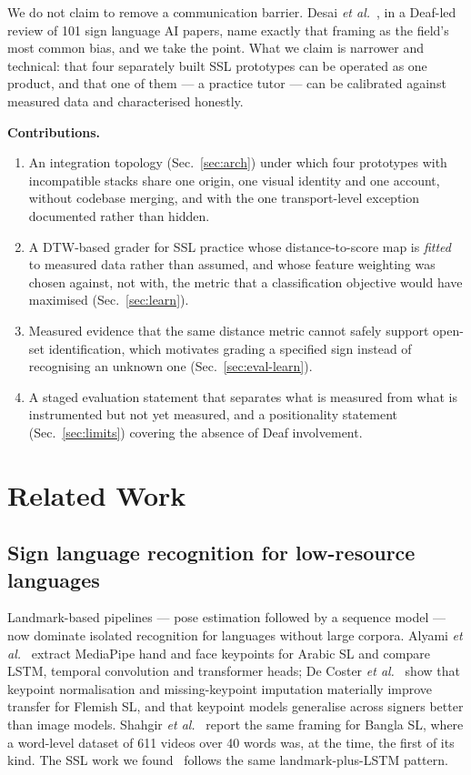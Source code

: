 \documentclass[conference]{IEEEtran}
\begin{document}
We do not claim to remove a communication barrier. Desai
\emph{et al.}~\cite{desai2024systemic}, in a Deaf-led review of 101 sign
language AI papers, name exactly that framing as the field's most common
bias, and we take the point. What we claim is narrower and technical: that
four separately built SSL prototypes can be operated as one product, and that
one of them --- a practice tutor --- can be calibrated against measured data
and characterised honestly.

\textbf{Contributions.}
\begin{enumerate}
\item An integration topology (Sec.~\ref{sec:arch}) under which four
prototypes with incompatible stacks share one origin, one visual identity and
one account, without codebase merging, and with the one transport-level
exception documented rather than hidden.
\item A DTW-based grader for SSL practice whose distance-to-score map is
\emph{fitted} to measured data rather than assumed, and whose feature
weighting was chosen against, not with, the metric that a classification
objective would have maximised (Sec.~\ref{sec:learn}).
\item Measured evidence that the same distance metric cannot safely support
open-set identification, which motivates grading a specified sign instead of
recognising an unknown one (Sec.~\ref{sec:eval-learn}).
\item A staged evaluation statement that separates what is measured from what
is instrumented but not yet measured, and a positionality statement
(Sec.~\ref{sec:limits}) covering the absence of Deaf involvement.
\end{enumerate}

\section{Related Work}

\subsection{Sign language recognition for low-resource languages}
Landmark-based pipelines --- pose estimation followed by a sequence model ---
now dominate isolated recognition for languages without large corpora.
Alyami \emph{et al.}~\cite{alyami2024isolated} extract MediaPipe hand and face
keypoints for Arabic SL and compare LSTM, temporal convolution and
transformer heads; De Coster \emph{et al.}~\cite{decoster2023towards} show
that keypoint normalisation and missing-keypoint imputation materially improve
transfer for Flemish SL, and that keypoint models generalise across signers
better than image models. Shahgir \emph{et al.}~\cite{shahgir2024connecting}
report the same framing for Bangla SL, where a word-level dataset of 611
videos over 40 words was, at the time, the first of its kind. The SSL work we
found~\cite{thennakon2025realtime, herath2022approach} follows the same
landmark-plus-LSTM pattern.
\end{document}
